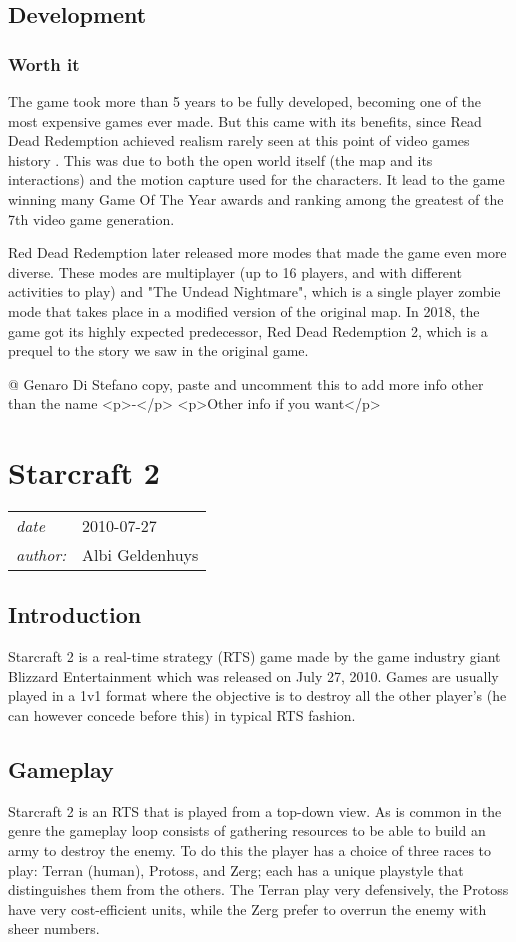 \documentclass[a4paper,10pt]{book}
\newcommand{\pageHeader}[4]{
    \section{#1}
    \vspace{-0.3cm}
    \begin{table}[h!]
     \begin{tabular}{ll}
        \hline
        \textit{date} & #2 \\
        \textit{author: } & #3\\
        \hline
     \end{tabular}
    \end{table}
    \vspace{-0.3cm}
}
\begin{document}
 \subsection{Development }
 \subsubsection{Worth it }
 
          The game took more than 5 years to be fully developed, becoming one of the most expensive games ever made. But this came with its benefits, since Read Dead Redemption achieved realism rarely seen at this point of video games history . This was due to both the open world itself (the map and its interactions) and the motion capture used for the characters. It lead to the game winning many Game Of The Year awards and ranking among the greatest of the 7th video game generation.
         
 Red Dead Redemption later released more modes that made the game even more diverse. These modes are multiplayer (up to 16 players, and with different activities to play) and "The Undead Nightmare", which is a single player zombie mode that takes place in a modified version of the original map. In 2018, the game got its highly expected predecessor, Red Dead Redemption 2, which is a prequel to the story we saw in the original game. 
 
 @ Genaro Di Stefano 
  copy, paste and uncomment this to add more info other than the name
            <p>-</p>
            <p>Other info if you want</p>
           
 
 \newpage\pageHeader{Starcraft 2}{2010-07-27}{Albi Geldenhuys}{The RTS game that popularized esports}
 \subsection{Introduction }
 
          Starcraft 2 is a real-time strategy (RTS) game made by the game industry giant Blizzard
          Entertainment which was released on July 27, 2010. Games are usually played in a 1v1 format
          where the objective is to destroy all the other player's (he can however concede before this)
          in typical RTS fashion.
         
 
 \subsection{Gameplay }
 
         Starcraft 2 is an RTS that is played from a top-down view. As is common in the genre the gameplay
         loop consists of gathering resources to be able to build an army to destroy the enemy.
         To do this the player has a choice of three races to play: Terran (human), Protoss, and Zerg;
         each has a unique playstyle that distinguishes them from the others. The Terran play very defensively,
         the Protoss have very cost-efficient units, while the Zerg prefer to overrun the enemy with sheer numbers.
         
\end{document}
